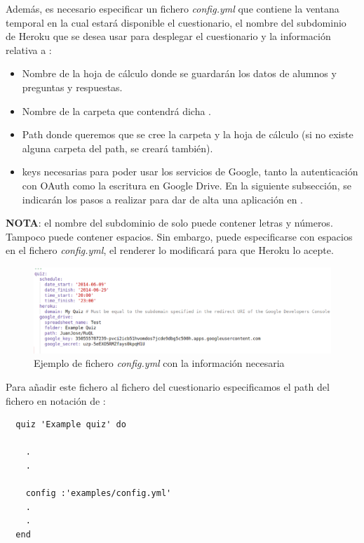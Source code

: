 Adem\'as, es necesario especificar un fichero \textit{config.yml} que contiene la ventana temporal en la cual estar\'a disponible
el cuestionario, el nombre del subdominio de Heroku que se desea usar para desplegar el cuestionario y la informaci\'on relativa a :
\begin{itemize}
  \item Nombre de la hoja de c\'alculo donde se guardar\'an los datos de alumnos y preguntas y respuestas.
  \item Nombre de la carpeta que contendr\'a dicha .
  \item Path donde queremos que se cree la carpeta y la hoja de c\'alculo (si no existe alguna carpeta del path, se crear\'a tambi\'en).
  \item {} keys necesarias para poder usar los servicios de Google, tanto la autenticaci\'on con OAuth como la escritura en Google Drive. 
  En la siguiente subsecci\'on,  se indicar\'an los pasos a realizar para dar de alta una aplicaci\'on en .
\end{itemize}

{\bfseries NOTA}: el nombre del subdominio de  solo puede contener letras y n\'umeros. Tampoco puede contener espacios. Sin embargo, puede especificarse
con espacios en el fichero \textit{config.yml}, el renderer lo modificar\'a para que Heroku lo acepte.
\bigskip

\begin{figure}[!th]
\begin{center}
\includegraphics[width=1.2\textwidth]{images/config_yml.eps}
\caption{Ejemplo de fichero \textit{config.yml} con la informaci\'on necesaria}
\label{fig:config_yml}
\end{center}
\end{figure}
\newpage

Para a\~{n}adir este fichero al fichero del cuestionario especificamos el path del fichero en notaci\'on de :
\begin{verbatim}
  quiz 'Example quiz' do
    
    .
    .
    
    config :'examples/config.yml'
    .
    .
  end
\end{verbatim}
\newpage

